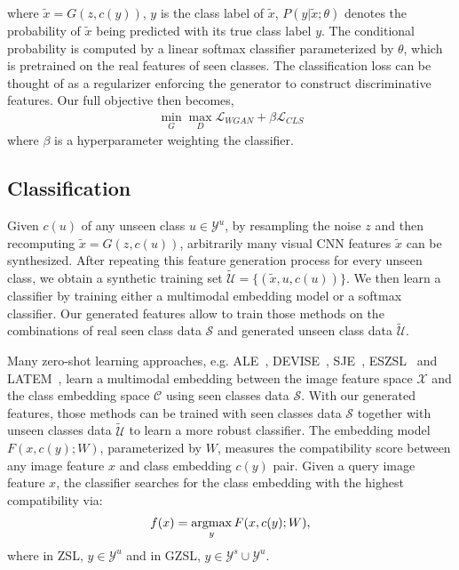 \documentclass[10pt,twocolumn,letterpaper]{article}
\newcommand{\myparagraph}[1]{\vspace{6pt}\noindent{\bf #1}}
\def\argmax{\mathop{\rm argmax}	}
\begin{document}
where $\tilde{x}=G(z,c(y))$, $y$ is the class label of $\tilde{x}$, $P(y| \tilde{x}; \theta)$ denotes the probability of $\tilde{x}$ being predicted with its true class label $y$. The conditional probability is computed by a linear softmax classifier parameterized by $\theta$, which is pretrained on the real features of seen classes. The classification loss can be thought of as a regularizer enforcing the generator to construct discriminative features. 
Our full objective then becomes,
\begin{align}
\min_G \max_D \mathcal{L}_{WGAN} + \beta \mathcal{L}_{CLS}
\end{align}
where $\beta$ is a hyperparameter weighting the classifier. 

\subsection{Classification}
\label{sec:ALE}

Given $c(u)$ of any unseen class $u\in \mathcal{Y}^u$, by resampling the noise $z$ and then recomputing $\tilde{x} = G(z, c(u))$, arbitrarily many visual CNN features $\tilde{x}$ can be synthesized. After repeating this feature generation process for every unseen class, we obtain a synthetic training set  $\tilde{\mathcal{U}}=\{(\tilde{x}, u, c(u))\}$. We then learn a classifier by training either a multimodal embedding model or a softmax classifier. Our generated features allow to train those methods on the combinations of real seen class data $\mathcal{S}$ and generated unseen class data $\tilde{\mathcal{U}}$.


\myparagraph{\texttt{Multimodal Embedding.}} Many zero-shot learning approaches, e.g. ALE~\cite{APHS15}, DEVISE~\cite{FCSBDRM13}, SJE~\cite{ARWLS15}, ESZSL~\cite{RT15} and LATEM~\cite{XASNHS16}, learn a multimodal embedding between the image feature space $\mathcal{X}$ and the class embedding space $\mathcal{C}$ using seen classes data $\mathcal{S}$. 
With our generated features, those methods can be trained with seen classes data $\mathcal{S}$ together with unseen classes data $\tilde{\mathcal{U}}$ to learn a more robust classifier.
The embedding model $F(x, c(y); W)$, parameterized by $W$, measures the compatibility score between any image feature $x$ and class embedding $c(y)$ pair. Given a query image feature $x$, the classifier searches for the class embedding with the highest compatibility via: 
\begin{equation}
f(x) = \argmax_{y} F(x, c(y); W),
\end{equation}
where in ZSL, $y \in\mathcal{Y}^{u}$ and in GZSL, $y\in\mathcal{Y}^{s} \cup \mathcal{Y}^{u}$.
\end{document}
